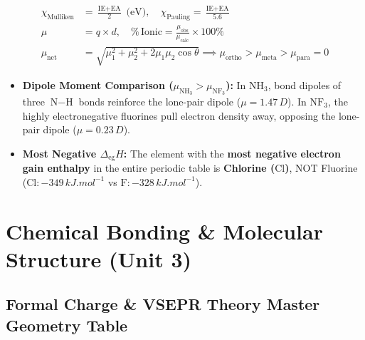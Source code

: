 \documentclass[10pt,twoside,openright]{book}
\begin{document}
\begin{formulabox}
\begin{align}
  \chi_{\text{Mulliken}} &= \frac{\text{IE} + \text{EA}}{2}\text{ (eV)}, \quad \chi_{\text{Pauling}} = \frac{\text{IE} + \text{EA}}{5.6} \\
  \mu &= q \times d, \quad \%\,\text{Ionic} = \frac{\mu_{\text{obs}}}{\mu_{\text{calc}}} \times 100\% \\
  \mu_{\text{net}} &= \sqrt{\mu_1^2 + \mu_2^2 + 2\mu_1\mu_2\cos\theta} \implies \mu_{\text{ortho}} > \mu_{\text{meta}} > \mu_{\text{para}} = 0
\end{align}
\end{formulabox}

\begin{trapbox}
\begin{itemize}
  \item \textbf{Dipole Moment Comparison ($\mu_{\text{NH}_3} > \mu_{\text{NF}_3}$):} In $\text{NH}_3$, bond dipoles of three $\text{N}-\text{H}$ bonds reinforce the lone-pair dipole ($\mu = 1.47\,\si{D}$). In $\text{NF}_3$, the highly electronegative fluorines pull electron density away, opposing the lone-pair dipole ($\mu = 0.23\,\si{D}$).
  \item \textbf{Most Negative $\Delta_{\text{eg}}H$:} The element with the \textbf{most negative electron gain enthalpy} in the entire periodic table is \textbf{Chlorine ($\text{Cl}$)}, NOT Fluorine ($\text{Cl}: -349\,\si{kJ.mol^{-1}}$ vs $\text{F}: -328\,\si{kJ.mol^{-1}}$).
\end{itemize}
\end{trapbox}

\newpage

\section{Chemical Bonding \& Molecular Structure (Unit 3)}

\subsection{Formal Charge \& VSEPR Theory Master Geometry Table}
\end{document}
